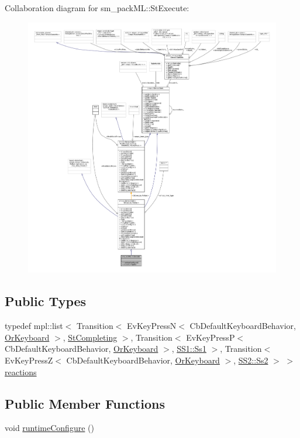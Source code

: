 Collaboration diagram for sm\+\_\+pack\+ML\+:\+:St\+Execute\+:
\nopagebreak
\begin{figure}[H]
\begin{center}
\leavevmode
\includegraphics[width=350pt]{structsm__packML_1_1StExecute__coll__graph}
\end{center}
\end{figure}
\subsection*{Public Types}
\begin{DoxyCompactItemize}
\item 
typedef mpl\+::list$<$ Transition$<$ Ev\+Key\+PressN$<$ Cb\+Default\+Keyboard\+Behavior, \hyperlink{classsm__packML_1_1OrKeyboard}{Or\+Keyboard} $>$, \hyperlink{structsm__packML_1_1StCompleting}{St\+Completing} $>$, Transition$<$ Ev\+Key\+PressP$<$ Cb\+Default\+Keyboard\+Behavior, \hyperlink{classsm__packML_1_1OrKeyboard}{Or\+Keyboard} $>$, \hyperlink{structsm__packML_1_1SS1_1_1Ss1}{S\+S1\+::\+Ss1} $>$, Transition$<$ Ev\+Key\+PressZ$<$ Cb\+Default\+Keyboard\+Behavior, \hyperlink{classsm__packML_1_1OrKeyboard}{Or\+Keyboard} $>$, \hyperlink{structsm__packML_1_1SS2_1_1Ss2}{S\+S2\+::\+Ss2} $>$ $>$ \hyperlink{structsm__packML_1_1StExecute_ade2bd54ab70b2dee61964b43eaaf0de5}{reactions}
\end{DoxyCompactItemize}
\subsection*{Public Member Functions}
\begin{DoxyCompactItemize}
\item 
void \hyperlink{structsm__packML_1_1StExecute_abf9c1ff5494fcb8aa62aca1c032e986a}{runtime\+Configure} ()
\end{DoxyCompactItemize}
